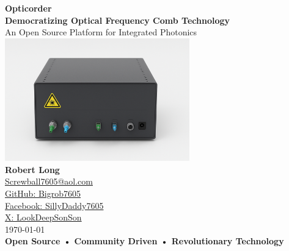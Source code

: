 \documentclass[11pt,a4paper]{article}
\begin{document}
\begin{titlepage}
\centering
\vspace*{2cm}

{\Huge\bfseries\color{opticorderblue} Opticorder}\\[0.5cm]
{\Large\bfseries Democratizing Optical Frequency Comb Technology}\\[1cm]

{\large An Open Source Platform for Integrated Photonics}\\[2cm]

\includegraphics[width=0.6\textwidth]{image.png}\\[2cm]

{\large\bfseries Robert Long}\\[0.5cm]
{\large \href{mailto:Screwball7605@aol.com}{Screwball7605@aol.com}}\\[0.3cm]
{\large \href{https://github.com/Bigrob7605/}{GitHub: Bigrob7605}}\\[0.3cm]
{\large \href{https://www.facebook.com/SillyDaddy7605}{Facebook: SillyDaddy7605}}\\[0.3cm]
{\large \href{https://x.com/LookDeepSonSon}{X: LookDeepSonSon}}\\[2cm]

{\large \today}\\[1cm]

\vfill
{\large \textbf{Open Source • Community Driven • Revolutionary Technology}}

\end{titlepage}
\end{document}

